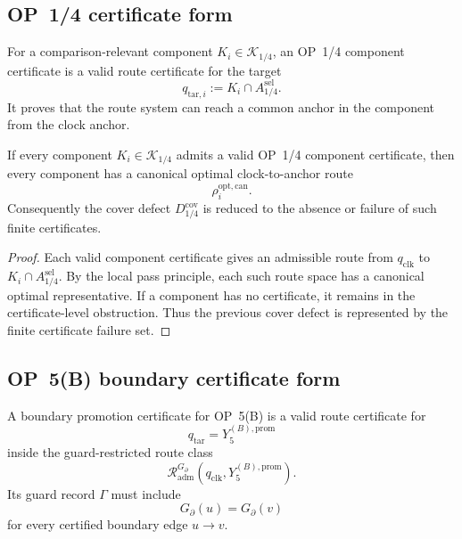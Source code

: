 \subsection{OP~1/4 certificate form}
\label{subsec:v410r11-op14-certificate-form}

\begin{definition}
\label{def:v410r11-op14-component-certificate}
For a comparison-relevant component \(K_i\in\mathcal K_{1/4}\), an OP~1/4
component certificate is a valid route certificate for the target
\[
 q_{\mathrm{tar},i}
 :=
 K_i\cap A_{1/4}^{\mathrm{sel}}.
\]
It proves that the route system can reach a common anchor in the component
from the clock anchor.
\end{definition}

\begin{proposition}
\label{prop:v410r11-op14-finite-certificate-reduction}
If every component \(K_i\in\mathcal K_{1/4}\) admits a valid OP~1/4 component
certificate, then every component has a canonical optimal clock-to-anchor route
\[
 \rho_i^{\mathrm{opt,can}}.
\]
Consequently the cover defect \(D_{1/4}^{\mathrm{cov}}\) is reduced to the
absence or failure of such finite certificates.
\end{proposition}

\begin{proof}
Each valid component certificate gives an admissible route from
\(q_{\mathrm{clk}}\) to \(K_i\cap A_{1/4}^{\mathrm{sel}}\). By the local pass
principle, each such route space has a canonical optimal representative. If a
component has no certificate, it remains in the certificate-level obstruction.
Thus the previous cover defect is represented by the finite certificate failure
set.
\end{proof}

\subsection{OP~5(B) boundary certificate form}
\label{subsec:v410r11-op5b-boundary-certificate-form}

\begin{definition}
\label{def:v410r11-boundary-promotion-certificate}
A boundary promotion certificate for OP~5(B) is a valid route certificate for
\[
 q_{\mathrm{tar}}
 =
 Y_{5}^{(B),\mathrm{prom}}
\]
inside the guard-restricted route class
\[
 \mathcal R_{\mathrm{adm}}^{G_{\partial}}
 (q_{\mathrm{clk}},Y_{5}^{(B),\mathrm{prom}}).
\]
Its guard record \(\Gamma\) must include
\[
 G_{\partial}(u)=G_{\partial}(v)
\]
for every certified boundary edge \(u\to v\).
\end{definition}

